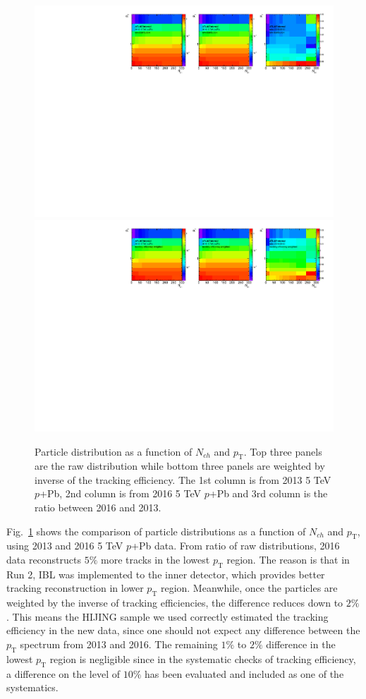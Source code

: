\begin{figure}[H]
\centering
\includegraphics[width=0.9\linewidth]{figs/sec_evtSlc/MC_pPb5_ev2_raw.pdf}
\includegraphics[width=0.9\linewidth]{figs/sec_evtSlc/MC_pPb5_ev2_crr.pdf}
\caption{Particle distribution as a function of $N_{ch}$ and $p_{\text{T}}$. Top three panels are the raw distribution while bottom three panels are weighted by inverse of the tracking efficiency. The 1st column is from 2013 5 TeV $p$+Pb, 2nd column is from 2016 5 TeV $p$+Pb and 3rd column is the ratio between 2016 and 2013.}
\label{fig:MC_pPb5_ev2}
\end{figure}
Fig.~\ref{fig:MC_pPb5_ev2} shows the comparison of particle distributions as a function of $N_{ch}$ and $p_{\text{T}}$, using 2013 and 2016 5 TeV $p$+Pb data. From ratio of raw distributions, 2016 data reconstructs $5\%$ more tracks in the lowest $p_{\text{T}}$ region. The reason is that in Run 2, IBL was implemented to the inner detector, which provides better tracking reconstruction in lower $p_{\text{T}}$ region. Meanwhile, once the particles are weighted by the inverse of tracking efficiencies, the difference reduces down to $2\%$. This means the HIJING sample we used correctly estimated the tracking efficiency in the new data, since one should not expect any difference between the $p_{\text{T}}$ spectrum from 2013 and 2016. The remaining $1\%$ to $2\%$ difference in the lowest $p_{\text{T}}$ region is negligible since in the systematic checks of tracking efficiency, a difference on the level of $10\%$ has been evaluated and included as one of the systematics.

